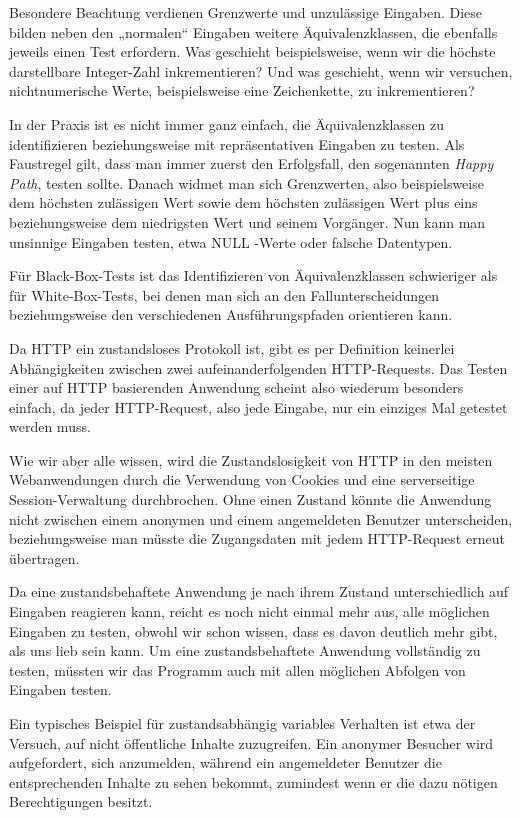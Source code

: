 Besondere Beachtung verdienen Grenzwerte und unzulässige Eingaben. Diese bilden neben
den „normalen“ Eingaben weitere Äquivalenzklassen, die ebenfalls jeweils einen Test
erfordern. Was geschieht beispielsweise, wenn wir die höchste darstellbare Integer-Zahl 
inkrementieren? Und was geschieht, wenn wir versuchen, nichtnumerische Werte, beispielsweise
eine Zeichenkette, zu inkrementieren?

In der Praxis ist es nicht immer ganz einfach, die Äquivalenzklassen zu identifizieren 
beziehungsweise mit repräsentativen Eingaben zu testen. Als Faustregel gilt, dass man immer
zuerst den Erfolgsfall, den sogenannten \textit{Happy Path}, testen sollte. Danach widmet man
sich Grenzwerten, also beispielsweise dem höchsten zulässigen Wert sowie dem höchsten
zulässigen Wert plus eins beziehungsweise dem niedrigsten Wert und seinem Vorgänger.
Nun kann man unsinnige Eingaben testen, etwa NULL -Werte oder falsche Datentypen.

Für Black-Box-Tests ist das Identifizieren von Äquivalenzklassen schwieriger als für White-Box-Tests,
bei denen man sich an den Fallunterscheidungen beziehungsweise den verschiedenen Ausführungspfaden orientieren kann.

Da HTTP ein zustandsloses Protokoll ist, gibt es per Definition keinerlei Abhängigkeiten
zwischen zwei aufeinanderfolgenden HTTP-Requests. Das Testen einer auf HTTP basierenden 
Anwendung scheint also wiederum besonders einfach, da jeder HTTP-Request, also jede Eingabe,
nur ein einziges Mal getestet werden muss.

Wie wir aber alle wissen, wird die Zustandslosigkeit von HTTP in den meisten Webanwendungen
durch die Verwendung von Cookies und eine serverseitige Session-Verwaltung durchbrochen. 
Ohne einen Zustand könnte die Anwendung nicht zwischen einem anonymen und einem angemeldeten
Benutzer unterscheiden, beziehungsweise man müsste die Zugangsdaten mit jedem HTTP-Request erneut übertragen.

Da eine zustandsbehaftete Anwendung je nach ihrem Zustand unterschiedlich auf Eingaben reagieren kann,
reicht es noch nicht einmal mehr aus, alle möglichen Eingaben zu testen, obwohl wir schon wissen, 
dass es davon deutlich mehr gibt, als uns lieb sein kann. Um eine zustandsbehaftete Anwendung
vollständig zu testen, müssten wir das Programm auch mit allen möglichen Abfolgen von Eingaben testen.

Ein typisches Beispiel für zustandsabhängig variables Verhalten ist etwa der Versuch, auf
nicht öffentliche Inhalte zuzugreifen. Ein anonymer Besucher wird aufgefordert, sich anzumelden,
während ein angemeldeter Benutzer die entsprechenden Inhalte zu sehen bekommt, zumindest wenn er
die dazu nötigen Berechtigungen besitzt. 

